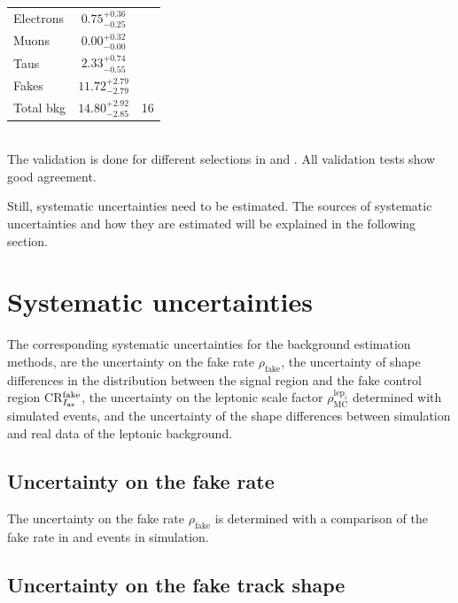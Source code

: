 \begin{table}[!h]
{\begin{tabular}{l|c |c}
\midrule
Electrons                                                      &       $0.75^{ + 0.36}_{ - 0.25}$            &                \\
Muons                                                          &       $0.00^{ + 0.32}_{- 0.00}$            &            \\
Taus                                                           &       $2.33^{ + 0.74}_{- 0.55}$            &          \\
Fakes                                                          &       $11.72^{ + 2.79}_{- 2.79}$            &          \\
\midrule
Total bkg                                                      &       $14.80^{ + 2.92}_{- 2.85}$            &  16        \\
\bottomrule
\end{tabular}}
\end{table}\\




The validation is done for different selections in \pt and \ias.
All validation tests show good agreement.

Still, systematic uncertainties need to be estimated.
The sources of systematic uncertainties and how they are estimated will be explained in the following section.


\section{Systematic uncertainties}
\label{sec:SysUncertaintiesBkg}

The corresponding systematic uncertainties for the background estimation methods, are the uncertainty on the fake rate $\rho_{\text{fake}}$, the uncertainty of shape differences in the \ias distribution between the signal region and the fake control region CR$_{I_{\text{as}}}^{\text{fake}}$, the uncertainty on the leptonic scale factor $\rho_{\text{MC}}^{\text{lep}_i}$ determined with simulated events, and the uncertainty of the shape differences between simulation and real data of the leptonic background.  
\subsection{Uncertainty on the fake rate}
\label{sec:FakeRateUncertainty}
The uncertainty on the fake rate $\rho_{\text{fake}}$ is determined with a comparison of the fake rate in \WJets and \Zlep events in simulation.
\subsection{Uncertainty on the fake track \ias shape}
\label{sec:FakeIasUncertainty}
